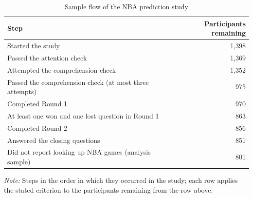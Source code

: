 \begin{table}[htbp]\centering
  \begin{threeparttable}
    \caption{Sample flow of the NBA prediction study}
    \label{tab:nba_sample_flow}
    \begin{tabular}{lr}
      \toprule
      Step & Participants remaining\\
      \midrule
      Started the study & 1,398\\
      Passed the attention check & 1,369\\
      Attempted the comprehension check & 1,352\\
      Passed the comprehension check (at most three attempts) & 975\\
      Completed Round 1 & 970\\
      At least one won and one lost question in Round 1 & 863\\
      Completed Round 2 & 856\\
      Answered the closing questions & 851\\
      Did not report looking up NBA games (analysis sample) & 801\\
      \bottomrule
    \end{tabular}
    \begin{tablenotes}
      \footnotesize
      \item \textit{Note:} Steps in the order in which they occurred in the study; each row applies the stated criterion to the participants remaining from the row above.
    \end{tablenotes}
  \end{threeparttable}
\end{table}
